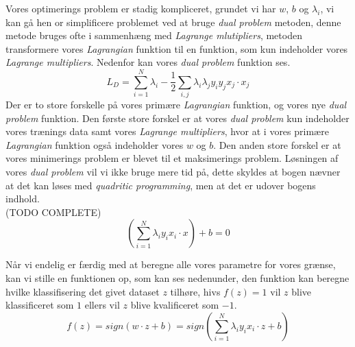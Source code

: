 \documentclass{article}
\begin{document}
Vores optimerings problem er stadig kompliceret, grundet vi har $w$, $b$ og $\lambda_i$, vi kan gå hen or simplificere problemet ved at bruge \textit{dual problem} metoden, denne metode bruges ofte i sammenhæng med \textit{Lagrange mlutipliers}, metoden transformere vores \textit{Lagrangian} funktion til en funktion, som kun indeholder vores \textit{Lagrange multipliers}. Nedenfor kan vores \textit{dual problem} funktion ses.
$$L_D = \sum\limits_{i=1}^N \lambda_i - \frac{1}{2}\sum\limits_{i,j} \lambda_i \lambda_j y_i y_j x_j \cdot x_j$$
Der er to store forskelle på vores primære \textit{Lagrangian} funktion, og vores nye \textit{dual problem} funktion. Den første store forskel er at vores \textit{dual problem} kun indeholder vores trænings data samt vores \textit{Lagrange multipliers}, hvor at i vores primære \textit{Lagrangian} funktion også indeholder vores $w$ og $b$. Den anden store forskel er at vores minimerings problem  er blevet til et maksimerings problem.
Løsningen af vores \textit{dual problem} vil vi ikke bruge mere tid på, dette skyldes at bogen nævner at det kan løses med \textit{quadritic programming}, men at det er udover bogens indhold. \\
(TODO COMPLETE)
$$( \sum\limits_{i=1}^N \lambda_i y_i x_i \cdot x) + b = 0$$

Når vi endelig er færdig med at beregne alle vores parametre for vores grænse, kan vi stille en funktionen op, som kan ses nedenunder, den funktion kan beregne hvilke klassifisering det givet dataset $z$ tilhøre, hivs $f(z) = 1$ vil $z$ blive klassificeret som $1$ ellers vil $z$ blive kvalificeret som $-1$. 
$$f(z) = sign(w \cdot z + b) = sign( \sum\limits_{i=1}^N \lambda_i y_i x_i \cdot z + b)$$
\end{document}
